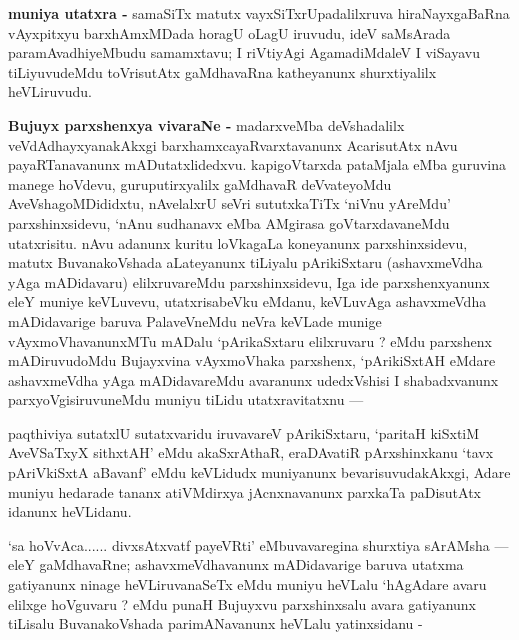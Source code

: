 \begin{artha}
{\bf muniya utatxra -} samaSiTx matutx vayxSiTxrUpadalilxruva hiraNayxgaBaRna vAyxpitxyu barxhAmxMDada horagU oLagU iruvudu, ideV saMsArada paramAvadhiyeMbudu samamxtavu; I riVtiyAgi AgamadiMdaleV I viSayavu tiLiyuvudeMdu toVrisutAtx gaMdhavaRna katheyanunx shurxtiyalilx heVLiruvudu.
\end{artha}

\begin{artha}
{\bf Bujuyx parxshenxya vivaraNe -} madarxveMba deVshadalilx veVdAdhayxyanakAkxgi barxhamxcayaRvarxtavanunx AcarisutAtx nAvu payaRTanavanunx mADutatxlidedxvu. kapigoVtarxda pataMjala eMba guruvina manege hoVdevu, guruputirxyalilx gaMdhavaR deVvateyoMdu AveVshagoMDididxtu, nAvelalxrU seVri sututxkaTiTx `niVnu yAreMdu' parxshinxsidevu, `nAnu sudhanavx eMba AMgirasa goVtarxdavaneMdu utatxrisitu. nAvu adanunx kuritu loVkagaLa koneyanunx parxshinxsidevu, matutx BuvanakoVshada aLateyanunx tiLiyalu pArikiSxtaru (ashavxmeVdha yAga mADidavaru) elilxruvareMdu parxshinxsidevu, Iga ide parxshenxyanunx eleY muniye keVLuvevu, utatxrisabeVku eMdanu, keVLuvAga ashavxmeVdha mADidavarige baruva PalaveVneMdu neVra keVLade munige vAyxmoVhavanunxMTu mADalu `pArikaSxtaru elilxruvaru ? eMdu parxshenx mADiruvudoMdu Bujayxvina vAyxmoVhaka parxshenx, `pArikiSxtAH eMdare ashavxmeVdha yAga mADidavareMdu avaranunx udedxVshisi I shabadxvanunx parxyoVgisiruvuneMdu muniyu tiLidu utatxravitatxnu ---
\end{artha}

\begin{artha}
paqthiviya sutatxlU sutatxvaridu iruvavareV pArikiSxtaru, `paritaH kiSxtiM AveVSaTxyX sithxtAH' eMdu akaSxrAthaR, eraDAvatiR pArxshinxkanu `tavx pAriVkiSxtA aBavanf' eMdu keVLidudx muniyanunx bevarisuvudakAkxgi, Adare muniyu hedarade tananx atiVMdirxya jAcnxnavanunx parxkaTa paDisutAtx idanunx heVLidanu.
\end{artha}

\begin{artha}
`sa hoVvAca...... divxsAtxvatf payeVRti' eMbuvavaregina shurxtiya sArAMsha --- eleY gaMdhavaRne; ashavxmeVdhavanunx mADidavarige baruva utatxma gatiyanunx ninage heVLiruvanaSeTx eMdu muniyu heVLalu `hAgAdare avaru elilxge hoVguvaru ? eMdu punaH Bujuyxvu parxshinxsalu avara gatiyanunx tiLisalu BuvanakoVshada parimANavanunx heVLalu yatinxsidanu - 
\end{artha}

